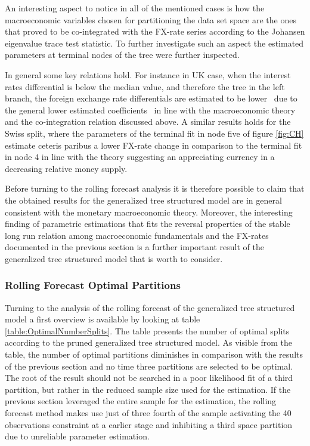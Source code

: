 An interesting aspect to notice in all of the mentioned cases is how
the macroeconomic variables chosen for partitioning the data set space
are the ones that proved to be co-integrated with the FX-rate series
according to the Johansen eigenvalue trace test statistic. To further
investigate such an aspect the estimated parameters at
terminal nodes of the tree were further inspected.

In general some key relations hold. For instance in UK case, when the
interest rates differential is below the median value, and therefore
the tree in the left branch, the foreign exchange rate differentials
are estimated to be lower \textendash \ due to the
general lower estimated coefficients \textendash \ in line with the
macroeconomic theory and the co-integration relation discussed
above. A similar results holds for the Swiss split, where the
parameters of the terminal fit in node five of figure \ref{fig:CH}
estimate ceteris paribus a lower FX-rate change in comparison to the
terminal fit in node 4 in line with the theory suggesting an
appreciating currency in a decreasing relative money supply.

Before turning to the rolling forecast analysis it is therefore
possible to claim that the obtained results for the generalized tree
structured model are in general consistent with the monetary
macroeconomic theory. Moreover, the interesting finding of parametric
estimations that fits the reversal properties of the stable long run
relation among macroeconomic fundamentals and the FX-rates documented
in the previous section is a further important result of the
generalized tree structured model that is worth to consider.

\subsubsection{Rolling Forecast Optimal Partitions}

Turning to the analysis of the rolling forecast of the generalized
tree structured model a first overview is available by looking at
table \ref{table:OptimalNumberSplits}. The table presents the number
of optimal splits according to the pruned generalized tree structured
model. As visible from the table, the number of optimal partitions
diminishes in comparison with the results of the previous section and
no time three partitions are selected to be optimal.  The root of
the result should not be searched in a poor likelihood fit of a third
partition, but rather in the reduced sample size used for the
estimation. If the previous section leveraged the entire sample for
the estimation, the rolling forecast method makes use just of three
fourth of the sample activating the 40 observations constraint at a
earlier stage and inhibiting a third space partition due to unreliable
parameter estimation.

